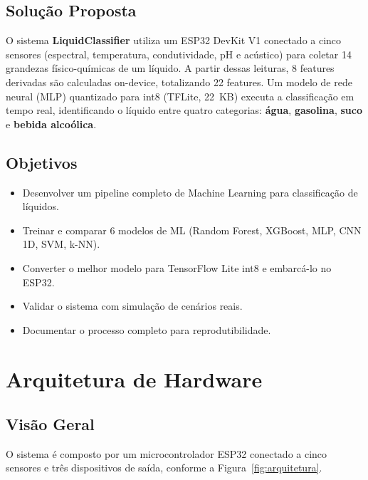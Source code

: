 \documentclass[12pt, a4paper]{article}
\begin{document}
\subsection{Solu\c{c}\~{a}o Proposta}

O sistema \textbf{LiquidClassifier} utiliza um ESP32 DevKit V1 conectado a cinco sensores (espectral, temperatura, condutividade, pH e ac\'{u}stico) para coletar 14 grandezas f\'{i}sico-qu\'{i}micas de um l\'{i}quido. A partir dessas leituras, 8 features derivadas s\~{a}o calculadas on-device, totalizando 22 features. Um modelo de rede neural (MLP) quantizado para int8 (TFLite, 22~KB) executa a classifica\c{c}\~{a}o em tempo real, identificando o l\'{i}quido entre quatro categorias: \textbf{\'{a}gua}, \textbf{gasolina}, \textbf{suco} e \textbf{bebida alco\'{o}lica}.

\subsection{Objetivos}

\begin{itemize}
  \item Desenvolver um pipeline completo de Machine Learning para classifica\c{c}\~{a}o de l\'{i}quidos.
  \item Treinar e comparar 6 modelos de ML (Random Forest, XGBoost, MLP, CNN 1D, SVM, k-NN).
  \item Converter o melhor modelo para TensorFlow Lite int8 e embarc\'{a}-lo no ESP32.
  \item Validar o sistema com simula\c{c}\~{a}o de cen\'{a}rios reais.
  \item Documentar o processo completo para reprodutibilidade.
\end{itemize}

\section{Arquitetura de Hardware}

\subsection{Vis\~{a}o Geral}

O sistema \'{e} composto por um microcontrolador ESP32 conectado a cinco sensores e tr\^{e}s dispositivos de sa\'{i}da, conforme a Figura~\ref{fig:arquitetura}.
\end{document}
